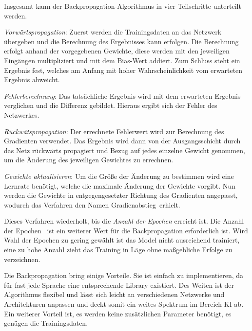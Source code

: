 Insgesamt kann der Backpropagation-Algorithmus in vier Teilschritte unterteilt werden.\vspace{0.2cm}

\textit{Vorwärtspropagation}: Zuerst werden die Trainingsdaten an das Netzwerk übergeben und die Berechnung des Ergebnisses kann erfolgen. Die Berechnung erfolgt anhand der vorgegebenen Gewichte, diese werden mit den jeweiligen Eingängen multipliziert und mit dem Bias-Wert addiert. Zum Schluss steht ein Ergebnis fest, welches am Anfang mit hoher Wahrscheinlichkeit vom erwarteten Ergebnis abweicht.\vspace{0.2cm}

\textit{Fehlerberechnung}: Das tatsächliche Ergebnis wird mit dem erwarteten Ergebnis verglichen und die Differenz gebildet. Hieraus ergibt sich der Fehler des Netzwerkes.\vspace{0.2cm}

\textit{Rückwätspropagation}: Der errechnete Fehlerwert wird zur Berechnung des Gradienten verwendet. Das Ergebnis wird dann von der Ausgangsschicht durch das Netz rückwärts propagiert und Bezug auf jedes einzelne Gewicht genommen, um die Änderung des jeweiligen Gewichtes zu errechnen.\vspace{0.2cm}

\textit{Gewichte aktualisieren}: Um die Größe der Änderung zu bestimmen wird eine Lernrate benötigt, welche die maximale Änderung der Gewichte vorgibt. Nun werden die Gewichte in entgegengesetzter Richtung des Gradienten angepasst, wodurch das Verfahren den Namen \glqq Gradienabstieg\grqq \ erhielt.\vspace{0.2cm}

Dieses Verfahren wiederholt, bis die \textit{Anzahl der Epochen} erreicht ist. Die \glqq Anzahl der Epochen \grqq \ ist ein weiterer Wert für die Backpropagation erforderlich ist. Wird Wahl der Epochen zu gering gewählt ist das Model nicht ausreichend trainiert, eine zu hohe Anzahl zieht das Training in Läge ohne maßgebliche Erfolge zu verzeichnen.\vspace{0.2cm}

Die Backpropagation bring einige Vorteile. Sie ist einfach zu implementieren, da für fast jede Sprache eine entsprechende Library existiert. Des Weiten ist der Algorithmus flexibel und lässt sich leicht an verschiedenen Netzwerke und Architekturen anpassen und deckt somit ein weites Spektrum im Bereich KI ab. Ein weiterer Vorteil ist, es werden keine zusätzlichen Parameter benötigt, es genügen die Trainingsdaten.\vspace{0.2cm}

